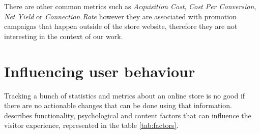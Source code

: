 There are other common metrics such as \textit{Acquisition Cost}, \textit{Cost 
Per Conversion}, \textit{Net Yield} or \textit{Connection Rate} however they 
are associated with promotion campaigns that happen outside of the store 
website, therefore they are not interesting in the context of our work.

\section{Influencing user behaviour}

Tracking a bunch of statistics and metrics about an online store is no good if 
there are no actionable changes that can be done using that information. 
\cite{Constantinides2004} describes functionality, psychological and content 
factors that can influence the visitor experience, represented in the table 
\ref{tab:factors}.

